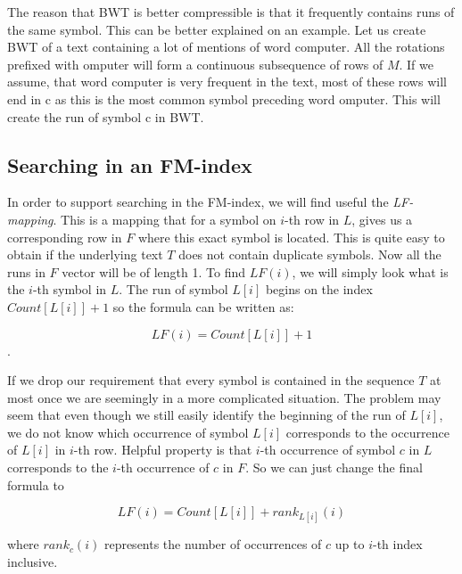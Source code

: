 The reason that BWT is better compressible is that it frequently contains runs of the same
symbol. This can be better explained on an example. Let us create BWT of a text containing
a lot of mentions of word computer. All the rotations prefixed with omputer will form a
continuous subsequence of rows of $M$. If we assume, that word computer is very frequent in the
text, most of these rows will end in c as this is the most common symbol preceding word omputer.
This will create the run of symbol c in BWT.

\subsection{Searching in an FM-index}

In order to support searching in the FM-index, we will find useful the \textit{LF-mapping}.
This is a mapping that for a symbol on $i$-th row in $L$, gives us a corresponding row in $F$
where this exact symbol is located. This is quite easy to obtain if the underlying text $T$
does not contain duplicate symbols. Now all the runs in $F$ vector will be of length 1.
To find $LF(i)$, we will simply look what is the $i$-th symbol in $L$. The run of
symbol $L[i]$ begins on the index $Count[L[i]] + 1$ so the formula can be written as:

$$LF(i) = Count[L[i]] + 1$$.

If we drop our requirement that every symbol is contained in the sequence $T$ at most once
we are seemingly in a more complicated situation. The problem may seem that even
though we still easily identify the beginning of the run of $L[i]$, we do not
know which occurrence of symbol $L[i]$ corresponds to the occurrence of $L[i]$ in $i$-th row.
Helpful property is that $i$-th occurrence of symbol $c$ in $L$ corresponds to the
$i$-th occurrence of $c$ in $F$. So we can just change the final formula to

				$$LF(i) = Count[L[i]] + rank_{L[i]}(i)$$

where $rank_c(i)$ represents the number of occurrences of $c$ up to $i$-th index inclusive.



